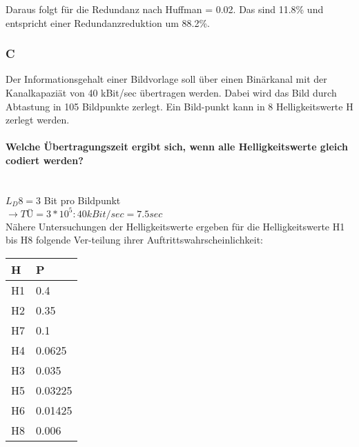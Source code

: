 Daraus folgt für die Redundanz nach Huffman = 0.02. 
Das sind 11.8\% und entspricht einer Redundanzreduktion um 88.2\%.

\subsubsection{C}
Der Informationsgehalt einer Bildvorlage soll über einen Binärkanal mit der Kanalkapaziät von 40 kBit/sec übertragen werden. Dabei wird das Bild durch Abtastung in 105 Bildpunkte zerlegt. Ein Bild-punkt kann in 8 Helligkeitswerte H zerlegt werden.

\paragraph{Welche Übertragungszeit ergibt sich, wenn alle Helligkeitswerte gleich codiert werden?}\mbox{}\\
$L_D 8=3$ Bit pro Bildpunkt\\
$\rightarrow TÜ = 3*10^5:40kBit/sec=7.5sec$\\

Nähere Untersuchungen der Helligkeitswerte ergeben für die Helligkeitswerte H1 bis H8 folgende Ver-teilung ihrer Auftrittswahrscheinlichkeit:
\begin{center}
    \centering
    \begin{tabular}{l | l}
        \bfseries{H} & \bfseries{P}\\ \hline
        H1 & 0.4\\ 
        H2 & 0.35\\
        H7 & 0.1\\
        H4 & 0.0625\\
        H3 & 0.035\\
        H5 & 0.03225\\
        H6 & 0.01425\\
        H8 & 0.006
    \end{tabular}
\end{center}

